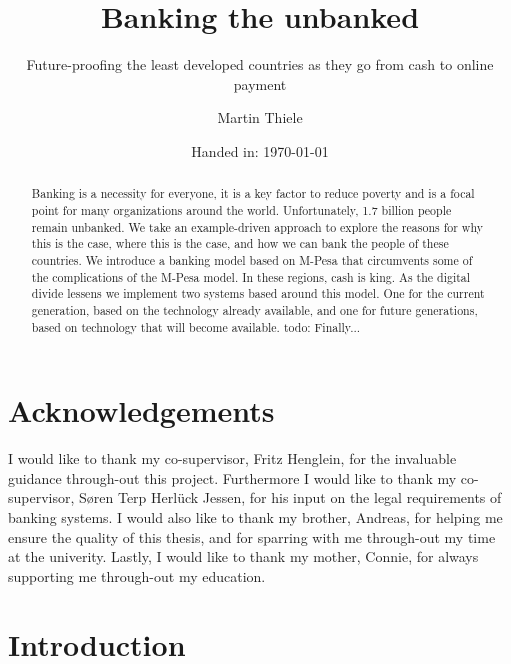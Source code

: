 \documentclass[11pt, a4paper]{article}
\author{Martin Thiele}
\title{Banking the unbanked}
\subtitle{Future-proofing the least developed countries as they go from cash to online payment}
\date{Handed in: \today}
\begin{document}
\renewcommand{\bibname}{References}


\maketitle

\begin{abstract}
\noindent   Banking is a necessity for everyone, it is a key factor to reduce poverty and is a focal point for many organizations around the world. Unfortunately, 1.7 billion people remain unbanked. We take an example-driven approach to explore the reasons for why this is the case, where this is the case, and how we can bank the people of these countries. We introduce a banking model based on M-Pesa that circumvents some of the complications of the M-Pesa model. In these regions, cash is king. As the digital divide lessens we implement two systems based around this model. One for the current generation, based on the technology already available, and one for future generations, based on technology that will become available. {\color{red} todo: Finally...}
\end{abstract}

\clearpage

\section*{Acknowledgements}
I would like to thank my co-supervisor, Fritz Henglein, for the invaluable guidance through-out this project. Furthermore I would like to thank my co-supervisor, Søren Terp Herlück Jessen, for his input on the legal requirements of banking systems. I would also like to thank my brother, Andreas, for helping me ensure the quality of this thesis, and for sparring with me through-out my time at the univerity. Lastly, I would like to thank my mother, Connie, for always supporting me through-out my education.

\clearpage

\tableofcontents
\clearpage


\section{Introduction}
\end{document}
